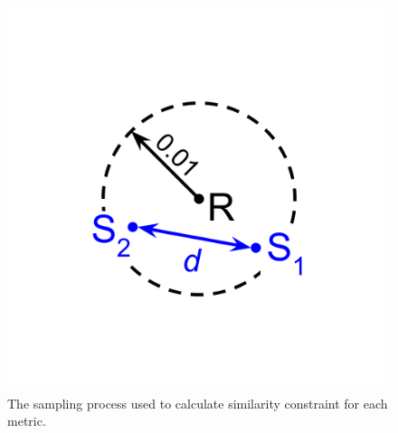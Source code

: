\begin{figure}
\begin{center}

\begin{minipage}{0.45\linewidth}
\includegraphics[width=\linewidth]{img/dimensionality-statistic}
\end{minipage}
\begin{minipage}{0.45\linewidth}
\caption{
The sampling process used to calculate similarity constraint for each metric.
}
\label{fig:dimensionality_measure}
\end{minipage}
\end{center}
\end{figure}
